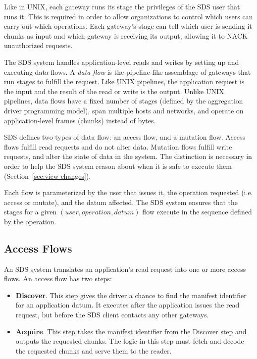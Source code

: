 Like in UNIX, each gateway runs its stage the privileges of the SDS user
that runs it.  This is required in order to allow organizations to control which
users can carry out which operations.  Each gateway's stage can tell which user is
sending it chunks as input and which gateway is receiving its output,
allowing it to NACK unauthorized requests.

The SDS system handles application-level reads and writes by setting up and
executing data flows.  A \emph{data flow} is the pipeline-like assemblage of gateways
that run stages to fulfill the request.  Like UNIX pipelines, the application
request is the input and the result of
the read or write is the output.  Unlike UNIX pipelines, data flows have a fixed
number of stages (defined by the aggregation driver programming model), span
multiple hosts and networks, and operate on application-level frames (chunks) instead of bytes.

SDS defines two types of data flow:  an access flow, and a mutation flow.
Access flows fulfill read requests and do not alter data.  Mutation flows fulfill write requests, and alter
the state of data in the system.  The distinction is necessary in order to help
the SDS system reason about when it is safe to execute them
(Section~\ref{sec:view-changes}).

Each flow is parameterized by the user that issues it, the operation requested
(i.e. access or mutate), and the datum affected.  The SDS system ensures that
the stages for a given $(user, operation, datum)$ flow execute in the
sequence defined by the operation.

\subsection{Access Flows}

An SDS system translates an application's read request into one or more access
flows.  An access flow has two steps:

\begin{itemize}
    \item \textbf{Discover}.  This step gives the driver a chance to find the
manifest identifier for an application datum.  It executes after the application issues
the read request, but before the SDS client contacts any other gateways.
    \item \textbf{Acquire}.  This step takes the manifest identifier from the
Discover step and outputs the requested chunks.  The logic in this 
step must fetch and decode the requested chunks and serve them to the reader.
\end{itemize}

